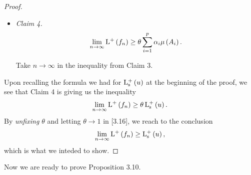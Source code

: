 \documentclass[pmath450]{subfiles}
\begin{document}
\begin{proof}
\begin{itemize}
            \item \textit{Claim 4.
                \begin{equation*}
                    \lim_{n\to\infty}\operatorname{L^+}\left( f_n \right) \geq \theta\sum^{p}_{i=1}\alpha_i\mu\left( A_i \right).
                \end{equation*}}

                \begin{subproof}
                    Take $n\to\infty$ in the inequality from Claim 3.
                \end{subproof}
        \end{itemize} 
        Upon recalling the formula we had for $\operatorname{L^+_s}\left( u \right)$ at the beginning of the proof, we see that Claim 4 is giving us the inequality
        \begin{equation}
            \lim_{n\to\infty}\operatorname{L^+}\left( f_n \right) \geq\theta\operatorname{L^+_s}\left( u \right).
        \end{equation}
        By \textit{unfixing $\theta$} and letting $\theta\to 1$ in [3.16], we reach to the conclusion
        \begin{equation*}
            \lim_{n\to\infty}\operatorname{L^+}\left( f_n \right) \geq\operatorname{L^+_s}\left( u \right),
        \end{equation*}
        which is what we inteded to show.
    \end{proof}

    \np Now we are ready to prove Proposition 3.10.
\end{document}
